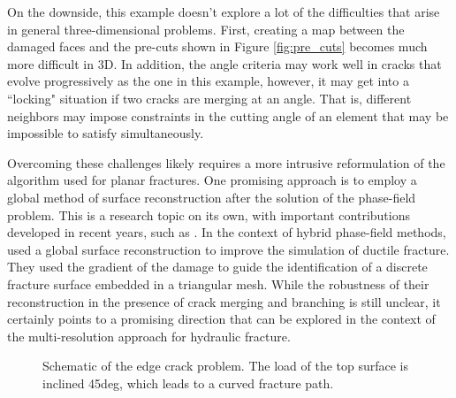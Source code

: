 On the downside, this example doesn't explore a lot of the difficulties that arise in general three-dimensional problems. First, creating a map between the damaged faces and the pre-cuts shown in Figure \ref{fig:pre_cuts} becomes much more difficult in 3D. In addition, the angle criteria may work well in cracks that evolve progressively as the one in this example, however, it may get into a ``locking" situation if two cracks are merging at an angle. That is, different neighbors may impose constraints in the cutting angle of an element that may be impossible to satisfy simultaneously. 

Overcoming these challenges likely requires a more intrusive reformulation of the algorithm used for planar fractures. One promising approach is to employ a global method of surface reconstruction after the solution of the phase-field problem. This is a research topic on its own, with important contributions developed in recent years, such as \cite{yang2021explicit, zeng2022tracking, xu2023reconstruct}. In the context of hybrid phase-field methods, \cite{eldahshan2021cipfar} used a global surface reconstruction to improve the simulation of ductile fracture. They used the gradient of the damage to guide the identification of a discrete fracture surface embedded in a triangular mesh. While the robustness of their reconstruction in the presence of crack merging and branching is still unclear, it certainly points to a promising direction that can be explored in the context of the multi-resolution approach for hydraulic fracture.

\begin{figure}[ht]
    \centering
    \caption{Schematic of the edge crack problem. The load of the top surface is inclined 45deg, which leads to a curved fracture path.}
    \label{fig:nonplanar_schematic}
\end{figure}

